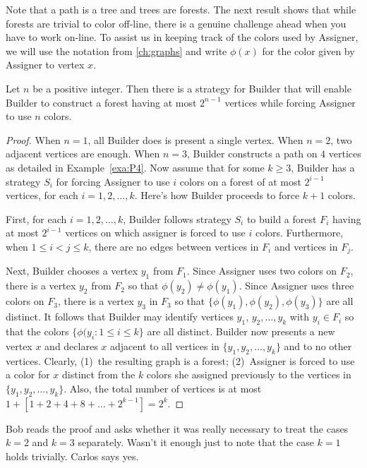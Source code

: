 Note that a path is a tree and trees are forests.  The next result
shows that while forests are trivial to color off-line, there is
a genuine challenge ahead when you have to work on-line.  To assist
us in keeping track of the colors used by Assigner, we will
use the notation from \autoref{ch:graphs} and write $\phi(x)$ for
the color given by Assigner to vertex $x$.

\begin{theorem}\label{thm:olforest}
Let $n$ be a positive integer.  Then there is a strategy for
Builder that will enable Builder to construct a forest having
at most $2^{n-1}$ vertices while forcing
Assigner to use $n$ colors.
\end{theorem}

\begin{proof}
When $n=1$, all Builder does is present a single vertex.  When
$n=2$, two adjacent vertices are enough.  When $n=3$, Builder
constructs a path on $4$ vertices as detailed in Example~\ref{exa:P4}.
Now assume that for some $k\ge3$, Builder has a strategy $S_i$ for
forcing Assigner to use $i$ colors on a forest of at most $2^{i-1}$
vertices, for each $i=1,2,\dots,k$.  Here's how Builder proceeds
to force $k+1$ colors.

First, for each $i=1,2,\dots,k$, Builder follows strategy $S_i$
to build a forest $F_i$ having at most $2^{i-1}$ vertices on which
assigner is forced to use $i$ colors.  Furthermore, when $1\le i<j\le k$,
there are no edges between vertices in $F_i$ and vertices in $F_j$.

Next, Builder chooses a vertex $y_1$ from $F_1$.  Since 
Assigner uses two colors on $F_2$, there is a vertex $y_2$ from
$F_2$ so that $\phi(y_2)\neq \phi(y_1)$.  Since Assigner uses
three colors on $F_3$, there is a vertex $y_3$ in $F_3$ so that
$\{\phi(y_1),\phi(y_2),\phi(y_3)\}$ are all distinct.  It follows
that Builder may identify vertices $y_1$, $y_2,\dots,y_k$ with
$y_i\in F_i$ so that the colors $\{\phi(y_i:1\le i\le k\}$ are
all distinct.  Builder now presents a new vertex $x$ and 
declares $x$ adjacent to all vertices in $\{y_1,y_2,\dots,y_k\}$ and to
no other vertices.  Clearly, (1)~the resulting graph is a forest; 
(2)~Assigner is forced to use a color for $x$ distinct from
the $k$ colors she assigned previously to the vertices in $\{y_1,y_2,\dots,
y_k\}$.  Also, the total number of vertices is at most $1+[1+2+4+8+\dots+2^{k-1}]=2^k$.
\end{proof}

Bob reads the proof and asks whether it was really necessary to treat the 
cases $k=2$ and $k=3$ separately.  Wasn't it enough just to note that the
case $k=1$ holds trivially.  Carlos says yes.

